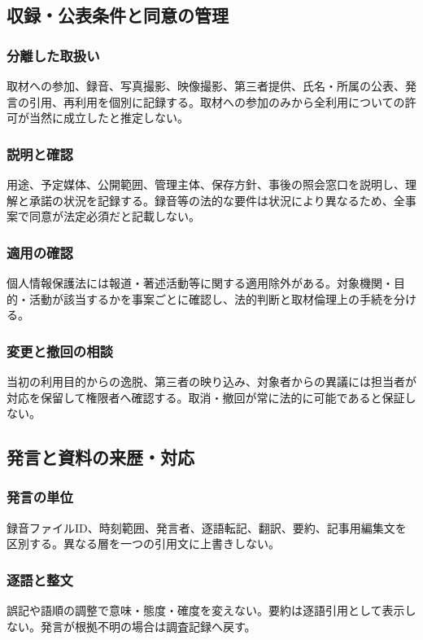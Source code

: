 \documentclass[a4paper,11pt]{article}
\begin{document}
\subsection{収録・公表条件と同意の管理}
\subsubsection{分離した取扱い}
\par 取材への参加、録音、写真撮影、映像撮影、第三者提供、氏名・所属の公表、発言の引用、再利用を個別に記録する。取材への参加のみから全利用についての許可が当然に成立したと推定しない。\par\medskip
\subsubsection{説明と確認}
\par 用途、予定媒体、公開範囲、管理主体、保存方針、事後の照会窓口を説明し、理解と承諾の状況を記録する。録音等の法的な要件は状況により異なるため、全事案で同意が法定必須だと記載しない。\par\medskip
\subsubsection{適用の確認}
\par 個人情報保護法には報道・著述活動等に関する適用除外がある。対象機関・目的・活動が該当するかを事案ごとに確認し、法的判断と取材倫理上の手続を分ける。\par\medskip
\subsubsection{変更と撤回の相談}
\par 当初の利用目的からの逸脱、第三者の映り込み、対象者からの異議には担当者が対応を保留して権限者へ確認する。取消・撤回が常に法的に可能であると保証しない。\par\medskip
\subsection{発言と資料の来歴・対応}
\subsubsection{発言の単位}
\par 録音ファイルID、時刻範囲、発言者、逐語転記、翻訳、要約、記事用編集文を区別する。異なる層を一つの引用文に上書きしない。\par\medskip
\subsubsection{逐語と整文}
\par 誤記や語順の調整で意味・態度・確度を変えない。要約は逐語引用として表示しない。発言が根拠不明の場合は調査記録へ戻す。\par\medskip
\end{document}
